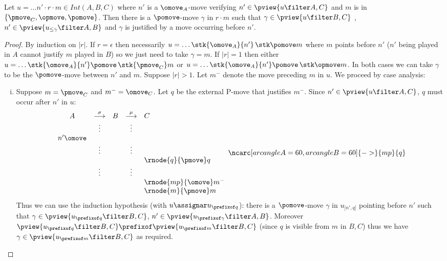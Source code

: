 \begin{lemma}
\label{lem:middlepomove}
Let $u = \ldots n' \cdot r \cdot m \in Int(A,B,C)$ where
$n'$ is a $\omove_A$-move verifying $n' \in \pview{u\filter A,C}$ and $m$ is in $\{ \pmove_C, \opmove, \pomove \}$. Then there is a $\pomove$-move $\gamma$ in $r \cdot m$ such that $\gamma \in \pview{u\filter B,C}$ , $n' \in \pview{u_{\leq \gamma} \filter A,B}$ and $\gamma$ is justified by a move occurring before $n'$.
\end{lemma}
\begin{proof}
By induction on $|r|$.
If $r=\epsilon$ then necessarily $u = \ldots \stk{\omove_A}{n'} \thinspace\stk \pomove m$ where $m$ points before $n'$ ($n'$ being played in $A$ cannot justify $m$ played in $B$) so we just need to take $\gamma = m$.
If $|r|=1$ then either
$u = \ldots \stk{\omove_A}{n'} \pomove\thinspace\stk {\pmove_C} m$
or $u = \ldots \stk{\omove_A}{n'} \pomove\thinspace\stk \opmove m$.
In both cases we can take $\gamma$ to be the $\pomove$-move between $n'$ and $m$.
Suppose $|r|>1$. Let $m^-$ denote the move preceding $m$ in $u$.
We proceed by case analysis:
\begin{enumerate}[i.]
\item Suppose $m = \pmove_C$ and $m^- = \omove_C$.
Let $q$ be the external P-move that justifies $m^-$.
Since $n' \in \pview{u\filter A,C}$, $q$ must occur after $n'$ in $u$:
$$
\begin{array}{ccccl}
A & \stackrel\sigma{\longrightarrow} & B & \stackrel\mu{\longrightarrow} & C \\
&\vdots&&\vdots\\
n' \omove\\
&\vdots&&\vdots  \\
&& & &  \rnode{q}{\pmove}q  \\
&\vdots&&\vdots  \\
&& & &  \rnode{mp}{\omove}m^-  \\
&& & &  \rnode{m}{\pmove}m  \\
\end{array}
\ncarc[arcangleA=60,arcangleB=60]{->}{mp}{q}
 $$
Thus we can use the induction hypothesis (with $u\assignar u_{\prefixof q}$): there is a $\pomove$-move $\gamma$
in $u_{]n',q]}$ pointing before $n'$ such that $\gamma \in \pview{u_{\prefixof q} \filter B,C}$, $n' \in \pview{u_{\prefixof \gamma} \filter A,B}$.
Moreover $\pview{u_{\prefixof q} \filter B,C} \prefixof \pview{u_{\prefixof m} \filter B,C}$ (since $q$ is visible from $m$ in $B,C$) thus we have $\gamma \in \pview{u_{\prefixof m} \filter B,C}$ as required.


\end{enumerate}
\end{proof}
